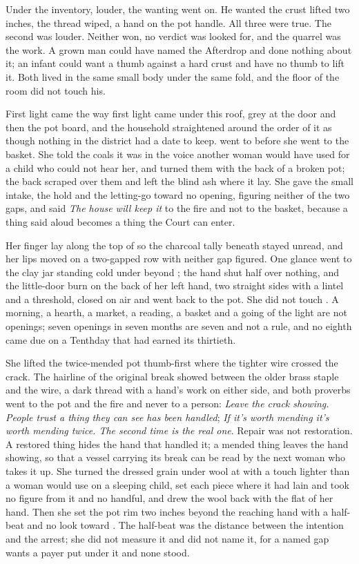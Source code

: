 Under the inventory, louder, the wanting went on. He wanted the crust lifted two inches, the thread wiped, a hand on the pot handle. All three were true. The second was louder. Neither won, no verdict was looked for, and the quarrel was the work. A grown man could have named the Afterdrop and done nothing about it; an infant could want a thumb against a hard crust and have no thumb to lift it. Both lived in the same small body under the same fold, and the floor of the room did not touch his.

First light came the way first light came under this roof, grey at the door and then the pot board, and the household straightened around the order of it as though nothing in the district had a date to keep.  went to  before she went to the basket. She told the coals it was  in the voice another woman would have used for a child who could not hear her, and turned them with the back of a broken pot; the back scraped over them and left the blind ash where it lay. She gave the small intake, the hold and the letting-go toward no opening, figuring neither of the two gaps, and said \emph{The house will keep it} to the fire and not to the basket, because a thing said aloud becomes a thing the Court can enter.

Her finger lay along the top of  so the charcoal tally beneath stayed unread, and her lips moved on a two-gapped row with neither gap figured. One glance went to the clay jar standing cold under  beyond ; the hand shut half over nothing, and the little-door burn on the back of her left hand, two straight sides with a lintel and a threshold, closed on air and went back to the pot. She did not touch . A morning, a hearth, a market, a reading, a basket and a going of the light are not openings; seven openings in seven months are seven and not a rule, and no eighth came due on a Tenthday that had earned its thirtieth.

She lifted the twice-mended pot thumb-first where the tighter wire crossed the crack. The hairline of the original break showed between the older brass staple and the wire, a dark thread with a hand's work on either side, and both proverbs went to the pot and the fire and never to a person: \emph{Leave the crack showing. People trust a thing they can see has been handled}; \emph{If it's worth mending it's worth mending twice. The second time is the real one}. Repair was not restoration. A restored thing hides the hand that handled it; a mended thing leaves the hand showing, so that a vessel carrying its break can be read by the next woman who takes it up. She turned the dressed grain under wool at  with a touch lighter than a woman would use on a sleeping child, set each piece where it had lain and took no figure from it and no handful, and drew the wool back with the flat of her hand. Then she set the pot rim two inches beyond the reaching hand with a half-beat and no look toward . The half-beat was the distance between the intention and the arrest; she did not measure it and did not name it, for a named gap wants a payer put under it and none stood.

